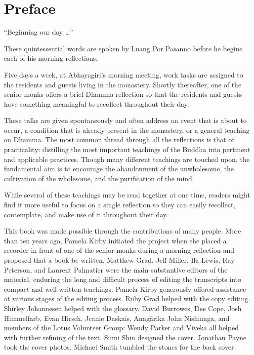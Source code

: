 \chapter*{Preface}

``Beginning our day \ldots{}''

These quintessential words are spoken by Luang Por Pasanno before he
begins each of his morning reflections.

Five days a week, at Abhayagiri's morning meeting, work tasks are
assigned to the residents and guests living in the monastery. Shortly
thereafter, one of the senior monks offers a brief Dhamma reflection so
that the residents and guests have something meaningful to recollect
throughout their day.

These talks are given spontaneously and often address an event that is
about to occur, a condition that is already present in the monastery, or
a general teaching on Dhamma. The most common thread through all the
reflections is that of practicality: distilling the most important
teachings of the Buddha into pertinent and applicable practices. Though
many different teachings are touched upon, the fundamental aim is to
encourage the abandonment of the unwholesome, the cultivation of the
wholesome, and the purification of the mind.

While several of these teachings may be read together at one time,
readers might find it more useful to focus on a single reflection so
they can easily recollect, contemplate, and make use of it throughout
their day.

This book was made possible through the contributions of many people.
More than ten years ago, Pamela Kirby initiated the project when she
placed a recorder in front of one of the senior monks during a morning
reflection and proposed that a book be written. Matthew Grad, Jeff
Miller, Ila Lewis, Ray Peterson, and Laurent Palmatier were the main
substantive editors of the material, enduring the long and difficult
process of editing the transcripts into compact and well-written
teachings. Pamela Kirby generously offered assistance at various stages
of the editing process. Ruby Grad helped with the copy editing. Shirley
Johannesen helped with the glossary. David Burrowes, Dee Cope, Josh
Himmelfarb, Evan Hirsch, Jeanie Daskais, Anagārika John Nishinaga, and
members of the \mbox{Lotus} \mbox{Volunteer} \mbox{Group}: Wendy Parker
and Viveka all helped with further refining of the text. Sumi Shin
designed the cover.  Jonathan Payne took the cover photos. Michael Smith
tumbled the stones for the back cover.

